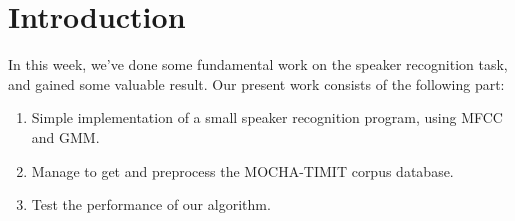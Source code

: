 
\section{Introduction}

In this week, we've done some fundamental work on the speaker recognition task, and gained
some valuable result. Our present work consists of the following part:

\begin{enumerate}
  \item Simple implementation of a small speaker recognition program, using MFCC and GMM.

  \item Manage to get and preprocess the MOCHA-TIMIT corpus database.

  \item Test the performance of our algorithm.
\end{enumerate}



